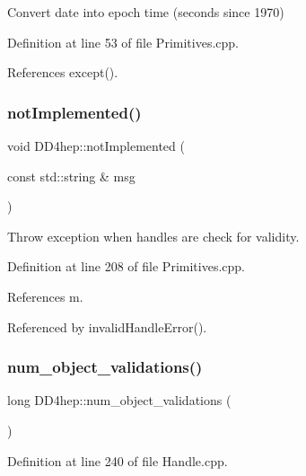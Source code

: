 Convert date into epoch time (seconds since 1970) 



Definition at line 53 of file Primitives.\+cpp.



References except().

\hypertarget{namespace_d_d4hep_a2567960a4486c9f442089e0893b84d27}{}\label{namespace_d_d4hep_a2567960a4486c9f442089e0893b84d27} 
\subsubsection{\texorpdfstring{not\+Implemented()}{notImplemented()}}
{\footnotesize\ttfamily void D\+D4hep\+::not\+Implemented (\begin{DoxyParamCaption}\item[{const std\+::string \&}]{msg }\end{DoxyParamCaption})}



Throw exception when handles are check for validity. 



Definition at line 208 of file Primitives.\+cpp.



References m.



Referenced by invalid\+Handle\+Error().

\hypertarget{namespace_d_d4hep_a022862a49c9bd20d654f90dbcb88c14f}{}\label{namespace_d_d4hep_a022862a49c9bd20d654f90dbcb88c14f} 
\subsubsection{\texorpdfstring{num\+\_\+object\+\_\+validations()}{num\_object\_validations()}}
{\footnotesize\ttfamily long D\+D4hep\+::num\+\_\+object\+\_\+validations (\begin{DoxyParamCaption}{ }\end{DoxyParamCaption})}



Definition at line 240 of file Handle.\+cpp.



